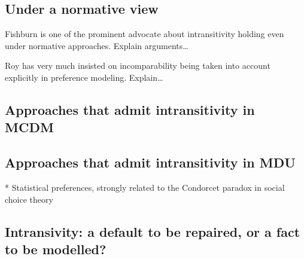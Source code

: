 \documentclass[french, english]{llncs}
\begin{document}
	\subsection{Under a normative view}
	Fishburn is one of the prominent advocate about intransitivity holding even under normative approaches. Explain arguments…
	
	Roy has very much insisted on incomparability being taken into account explicitly in preference modeling. Explain…
	
	\subsection{Approaches that admit intransitivity in MCDM}
	
	\subsection{Approaches that admit intransitivity in MDU}
	
	* Statistical preferences, strongly related to the Condorcet paradox in social choice theory
	
	\subsection{Intransivity: a default to be repaired, or a fact to be modelled?}
	
\end{document}

